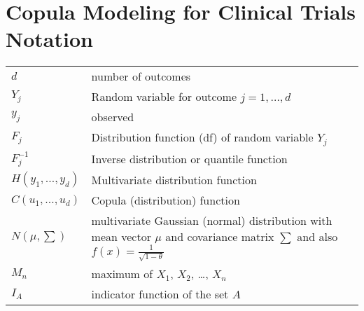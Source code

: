 \documentclass[12pt]{report}
\begin{document}
	
\section*{Copula Modeling for Clinical Trials Notation}

\begin{tabular}{p{1in}p{6.25in}}
	$d$ & number of outcomes \\
	$Y_j$ & Random variable for outcome $j=1,\ldots,d$\\
	$y_j$ & observed \\
	$F_j$ & Distribution function (df) of random variable $Y_j$ \\
	$F_j^{-1}$ & Inverse distribution or quantile function \\
	$H(y_1,\ldots,y_d)$ & Multivariate distribution function \\
	$C(u_1,\ldots,u_d)$ & Copula (distribution) function\\
	$N(\mu, \sum)$ & multivariate Gaussian (normal) distribution with mean vector $\mu$ and covariance matrix $\sum$ and also $f(x)=\frac{1}{\sqrt{1-\theta}}$\\
	$M_n$ & maximum of $X_1$, $X_2$, \ldots, $X_n$ \\
	$I_A$ & indicator function of the set $A$\\
\end{tabular}
\end{document}
